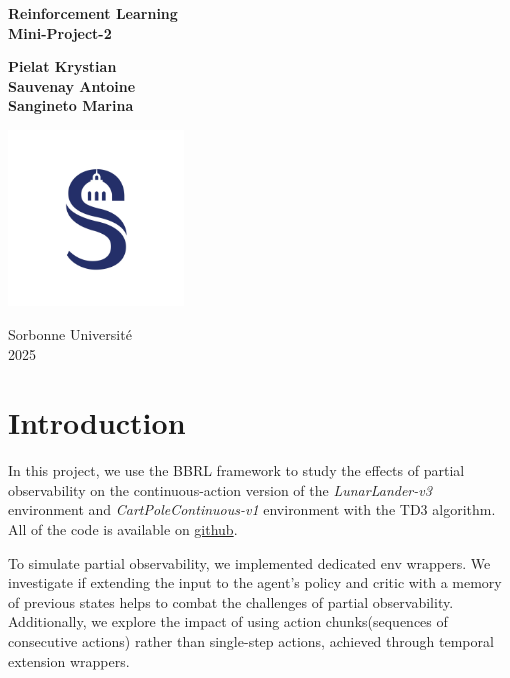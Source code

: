 \documentclass[12pt, a4paper]{article}
\begin{document}
\thispagestyle{empty}

\begin{center}
	{\bfseries \LARGE Reinforcement Learning \\[2mm]
	Mini-Project-2}

	\vfill

	{\large
	\textbf{Pielat Krystian} \\[2mm]
	\textbf{Sauvenay Antoine} \\[2mm]
	\textbf{Sangineto Marina}
	}

	\vfill

	\includegraphics[width=0.35\textwidth]{sorbonne.png}

	\vfill

	{\large Sorbonne Université} \\[2mm]
	{\large 2025}
\end{center}

\newpage
\tableofcontents
\newpage

\section{Introduction}

In this project, we use the BBRL framework to study the effects of partial observability on the continuous-action version of the \textit{LunarLander-v3} environment and \textit{CartPoleContinuous-v1} environment with the TD3 algorithm. All of the code is available on \href{https://github.com/KrystianPielat/rl-project-2/tree/master}{github}. \newline



To simulate partial observability, we implemented dedicated env wrappers. We investigate if extending the input to the agent’s policy and critic with a memory of previous states helps to combat the challenges of partial observability. Additionally, we explore the impact of using action chunks(sequences of consecutive actions) rather than single-step actions, achieved through temporal extension wrappers.\\
\end{document}
